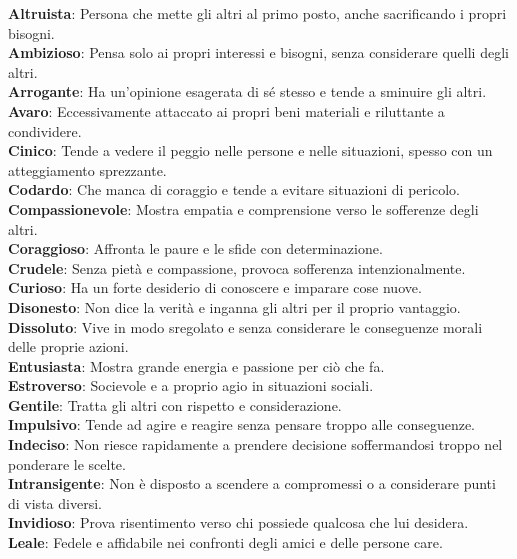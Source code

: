 \begin{multicols}{2}
{\textbf{Altruista}: Persona che mette gli altri al primo posto, anche sacrificando i propri bisogni.\\
\textbf{Ambizioso}: Pensa solo ai propri interessi e bisogni, senza considerare quelli degli altri.\\
\textbf{Arrogante}: Ha un'opinione esagerata di sé stesso e tende a sminuire gli altri.\\
\textbf{Avaro}: Eccessivamente attaccato ai propri beni materiali e riluttante a condividere.\\
\textbf{Cinico}: Tende a vedere il peggio nelle persone e nelle situazioni, spesso con un atteggiamento sprezzante.\\
\textbf{Codardo}: Che manca di coraggio e tende a evitare situazioni di pericolo.\\
\textbf{Compassionevole}: Mostra empatia e comprensione verso le sofferenze degli altri.\\
\textbf{Coraggioso}: Affronta le paure e le sfide con determinazione.\\
\textbf{Crudele}: Senza pietà e compassione, provoca sofferenza intenzionalmente.\\
\textbf{Curioso}: Ha un forte desiderio di conoscere e imparare cose nuove.\\
\textbf{Disonesto}: Non dice la verità e inganna gli altri per il proprio vantaggio.\\
\textbf{Dissoluto}: Vive in modo sregolato e senza considerare le conseguenze morali delle proprie azioni.\\
\textbf{Entusiasta}: Mostra grande energia e passione per ciò che fa.\\
\textbf{Estroverso}: Socievole e a proprio agio in situazioni sociali.\\
\textbf{Gentile}: Tratta gli altri con rispetto e considerazione.\\
\textbf{Impulsivo}: Tende ad agire e reagire senza pensare troppo alle conseguenze.\\
\textbf{Indeciso}: Non riesce rapidamente a prendere decisione soffermandosi troppo nel ponderare le scelte.\\
\textbf{Intransigente}: Non è disposto a scendere a compromessi o a considerare punti di vista diversi.\\
\textbf{Invidioso}: Prova risentimento verso chi possiede qualcosa che lui desidera.\\
\textbf{Leale}: Fedele e affidabile nei confronti degli amici e delle persone care.\\
}
\end{multicols}
